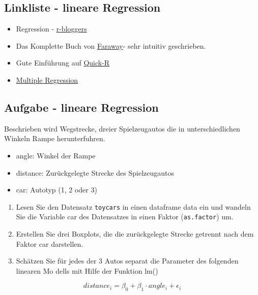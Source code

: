 \documentclass[]{article}
\providecommand{\tightlist}{%
  \setlength{\itemsep}{0pt}\setlength{\parskip}{0pt}}
\begin{document}
\subsection{Linkliste - lineare
Regression}\label{linkliste---lineare-regression}

\begin{itemize}
\item
  Regression -
  \href{http://www.r-bloggers.com/r-tutorial-series-simple-linear-regression/}{r-bloggers}
\item
  Das Komplette Buch von
  \href{http://cran.r-project.org/doc/contrib/Faraway-PRA.pdf}{Faraway}-
  sehr intuitiv geschrieben.
\item
  Gute Einführung auf
  \href{http://www.statmethods.net/stats/regression.html}{Quick-R}
\item
  \href{https://www.r-bloggers.com/multiple-regression-part-1/}{Multiple
  Regression}
\end{itemize}

\subsection{Aufgabe - lineare
Regression}\label{aufgabe---lineare-regression}

Beschrieben wird Wegstrecke, dreier Spielzeugautos die in
unterschiedlichen Winkeln Rampe herunterfuhren.

\begin{itemize}
\tightlist
\item
  angle: Winkel der Rampe
\item
  distance: Zurückgelegte Strecke des Spielzeugautos
\item
  car: Autotyp (1, 2 oder 3)
\end{itemize}

\begin{enumerate}
\def\labelenumi{(\alph{enumi})}
\item
  Lesen Sie den Datensatz \texttt{toycars} in einen dataframe data ein
  und wandeln Sie die Variable car des Datensatzes in einen Faktor
  (\texttt{as.factor}) um.
\item
  Erstellen Sie drei Boxplots, die die zurückgelegte Strecke getrennt
  nach dem Faktor car darstellen.
\item
  Schätzen Sie für jedes der 3 Autos separat die Parameter des folgenden
  linearen Mo dells mit Hilfe der Funktion lm()
\end{enumerate}

\[ distance_i= \beta_0 + \beta_1 \cdot angle_i + \epsilon_i\]
\end{document}
